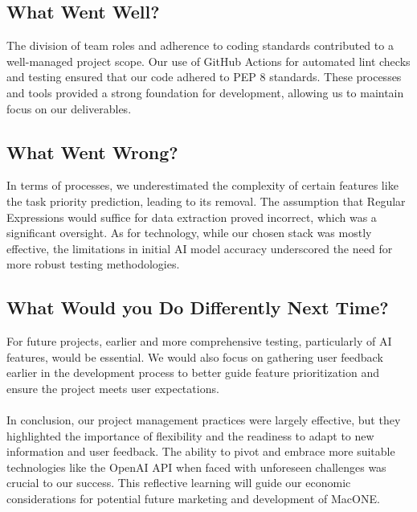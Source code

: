 \documentclass{article}
\begin{document}
\subsection{What Went Well?}
The division of team roles and adherence to coding standards contributed to a well-managed project scope. Our use of GitHub Actions for automated lint checks and testing ensured that our code adhered to PEP 8 standards. These processes and tools provided a strong foundation for development, allowing us to maintain focus on our deliverables.

\subsection{What Went Wrong?}
In terms of processes, we underestimated the complexity of certain features like the task priority prediction, leading to its removal. The assumption that Regular Expressions would suffice for data extraction proved incorrect, which was a significant oversight. As for technology, while our chosen stack was mostly effective, the limitations in initial AI model accuracy underscored the need for more robust testing methodologies.
\subsection{What Would you Do Differently Next Time?}

For future projects, earlier and more comprehensive testing, particularly of AI features, would be essential. We would also focus on gathering user feedback earlier in the development process to better guide feature prioritization and ensure the project meets user expectations.
\\\\
In conclusion, our project management practices were largely effective, but they highlighted the importance of flexibility and the readiness to adapt to new information and user feedback. The ability to pivot and embrace more suitable technologies like the OpenAI API when faced with unforeseen challenges was crucial to our success. This reflective learning will guide our economic considerations for potential future marketing and development of MacONE.
\end{document}
